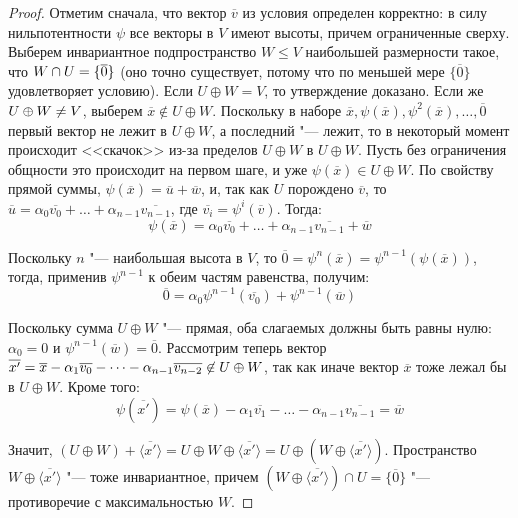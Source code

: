 \begin{proof}
	Отметим сначала, что вектор $\overline{v}$ из условия определен корректно: в силу нильпотентности $\psi$ все векторы в $V$ имеют высоты, причем ограниченные сверху. Выберем инвариантное подпространство $W \le V$ наибольшей размерности такое, что $W \cap U \hm{=} \{\overline{0}\}$ (оно точно существует, потому что по меньшей мере $\{\overline{0}\}$ удовлетворяет условию). Если $U \oplus W = V$, то утверждение доказано. Если же $U \oplus W \hm{\ne} V$, выберем $\overline{x} \not\in U \oplus W$. Поскольку в наборе $\overline{x}, \psi(\overline{x}), \psi^2(\overline{x}), \dots, \overline{0}$ первый вектор не лежит в $U \oplus W$, а последний "--- лежит, то в некоторый момент происходит <<скачок>> из-за пределов $U \oplus W$ в $U \oplus W$. Пусть без ограничения общности это происходит на первом шаге, и уже $\psi(\overline{x}) \in U \oplus W$. По свойству прямой суммы, $\psi(\overline{x}) = \overline{u} + \overline{w}$, и, так как $U$ порождено $\overline{v}$, то $\overline{u} = \alpha_0\overline{v_0} + \dots + \alpha_{n - 1}\overline{v_{n - 1}}$, где $\overline{v_i} = \psi^{i}(\overline{v})$. Тогда:
	\[\psi(\overline{x}) = \alpha_0\overline{v_0} + \dots + \alpha_{n - 1}\overline{v_{n - 1}} + \overline{w}\]
	
	Поскольку $n$ "--- наибольшая высота в $V$, то $\overline{0} = \psi^n(\overline{x}) = \psi^{n-1}(\psi(\overline{x}))$, тогда, применив $\psi^{n - 1}$ к обеим частям равенства, получим:
	\[\overline{0} = \alpha_0\psi^{n - 1}(\overline{v_0}) + \psi^{n - 1}(\overline{w})\]
	
	Поскольку сумма $U \oplus W$ "--- прямая, оба слагаемых должны быть равны нулю: $\alpha_0 = 0$ и $\psi^{n - 1}(\overline{w}) = \overline{0}$. Рассмотрим теперь вектор $\overline{x'} \hm{=} \overline{x} - \alpha_1\overline{v_0} - \dots - \alpha_{n-1}\overline{v_{n-2}} \not\in U \oplus W$, так как иначе вектор $\overline{x}$ тоже лежал бы в $U \oplus W$. Кроме того:
	\[\psi(\overline{x'}) = \psi(\overline{x}) - \alpha_1\overline{v_1} - \dots - \alpha_{n-1}\overline{v_{n-1}} = \overline{w}\]
	
	Значит, $(U \oplus W) + \langle\overline{x'}\rangle = U \oplus W \oplus \langle\overline{x'}\rangle = U \oplus (W \oplus \langle\overline{x'}\rangle)$. Пространство $W \oplus \langle\overline{x'}\rangle$ "--- тоже инвариантное, причем $(W \oplus \langle\overline{x'}\rangle) \cap U = \{\overline{0}\}$ "--- противоречие с максимальностью $W$.
\end{proof}


